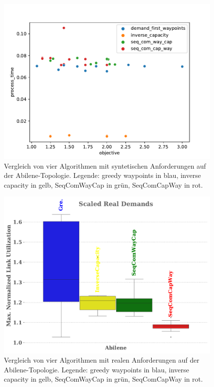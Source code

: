 \documentclass[sigconf, nonacm, review]{acmart}
\begin{document}
\begin{figure}
\centering
\includegraphics[width=\linewidth]{figures/pouria_colored_scatter_plot_results_all_algorithms.pdf}
\caption{Vergleich von vier Algorithmen mit syntetischen Anforderungen auf der Abilene-Topologie. Legende: greedy waypoints in blau, inverse capacity in gelb, SeqComWayCap in gr\"un, SeqComCapWay in rot.}
\label{fig:pouriaScatterSynthetic}
\end{figure}
\begin{figure}
\centering
\includegraphics[width=\linewidth]{figures/pouria_real_demands.pdf}
\caption{Vergleich von vier Algorithmen mit realen Anforderungen auf der Abilene-Topologie. Legende: greedy waypoints in blau, inverse capacity in gelb, SeqComWayCap in gr\"un, SeqComCapWay in rot.}
\label{fig:pouriaBoxplotReal}
\end{figure}
\end{document}
